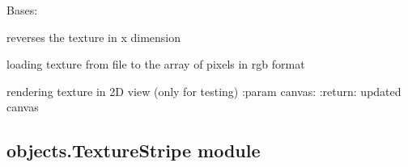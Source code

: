 \documentclass[letterpaper,10pt,english]{sphinxmanual}
\begin{document}
\begin{fulllineitems}
\label{\detokenize{objects:objects.Texture.Texture}}
\pysigstartsignatures
{}
\pysigstopsignatures
\sphinxAtStartPar
Bases: 

\begin{fulllineitems}
\label{\detokenize{objects:objects.Texture.Texture.create_reversed}}
\pysigstartsignatures
{}
\pysigstopsignatures
\sphinxAtStartPar
reverses the texture in x dimension

\end{fulllineitems}


\begin{fulllineitems}
\label{\detokenize{objects:objects.Texture.Texture.load}}
\pysigstartsignatures
{}
\pysigstopsignatures
\sphinxAtStartPar
loading texture from file to the array of pixels in rgb format

\end{fulllineitems}


\begin{fulllineitems}
\label{\detokenize{objects:objects.Texture.Texture.render}}
\pysigstartsignatures
{}
\pysigstopsignatures
\sphinxAtStartPar
rendering texture in 2D view (only for testing)
:param canvas:
:return: updated canvas

\end{fulllineitems}


\end{fulllineitems}



\subsection{objects.TextureStripe module}
\label{\detokenize{objects:module-objects.TextureStripe}}\label{\detokenize{objects:objects-texturestripe-module}}
\end{document}
